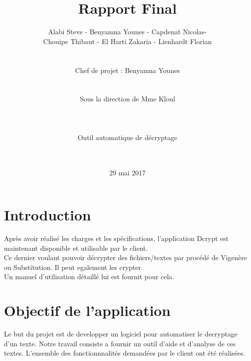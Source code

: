 \documentclass[a4]{article}
\begin{document}
	\title{\Huge{\textbf{Rapport Final}}}
	\author{Alabi Steve - Benyamna Younes - Capdenat Nicolas- \\
		Chouipe Thibaut - El Harti Zakaria - Lienhardt Florian \\ \\ \\
		Chef de projet : Benyamna Younes \\ \\ \\ 
		Sous la direction de Mme Kloul \\ \\ \\ \\
		Outil automatique de décryptage \\ \\ \\}
	\date{29 mai 2017}
		

	\begin{titlepage}
		\maketitle
		\vspace{20em}
	\end{titlepage}
	\section{Introduction}
Après avoir réalisé les charges et les spécifications, l'application Dcrypt est maintenant disponible et utilisable par le client. \\
Ce dernier voulant pouvoir décrypter des fichiers/textes par procédé de Vigenère ou Substitution. Il peut egalement les crypter. \\
Un manuel d'utilisation détaillé lui est fournit pour cela.
	\section{Objectif de l'application}
	Le but du
projet est de developper un logiciel pour automatiser le decryptage d'un texte. Notre travail consiste a fournir un outil d'aide et d’analyse de ces textes. L’ensemble des fonctionnnalités demandées par le client ont été réalisées.
\end{document}
